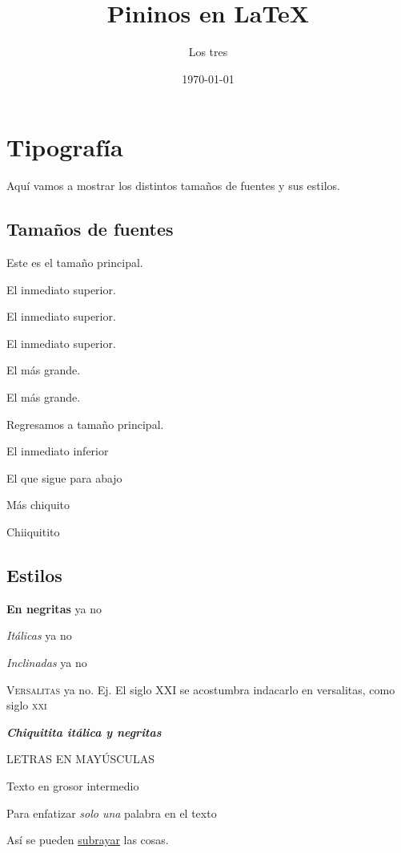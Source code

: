 \documentclass[10pt]{book}
\title{Pininos en \LaTeX}
\author{Los tres}
\date{\today}
\theoremstyle{definition}
\theoremstyle{theorem}
\theoremstyle{remark}
\begin{document}
\maketitle

\chapter{Tipografía}

Aquí vamos a mostrar los distintos tamaños de fuentes y sus estilos.
\section{Tamaños de fuentes}

\normalsize Este es el tamaño principal.

{\large El inmediato superior.}

{\Large El inmediato superior.}

{\LARGE El inmediato superior.}

{\huge El más grande.}

{\Huge El más grande.}

Regresamos a tamaño principal.

{\small El inmediato inferior}

{\footnotesize El que sigue para abajo}

{\scriptsize Más chiquito}

{\tiny Chiiquitito}

\section{Estilos}

{\bfseries En negritas} ya no

{\itshape Itálicas} ya no

{\slshape Inclinadas} ya no

{\scshape Versalitas} ya no. Ej. El siglo XXI se acostumbra indacarlo en versalitas, como siglo \textsc{xxi}


{\bfseries\itshape\tiny Chiquitita itálica y negritas }

{\uppercase {Letras en mayúsculas}} %

{\mdseries Texto en grosor intermedio} %

Para enfatizar \emph{solo una} palabra en el texto %

Así se pueden \ul{subrayar} las cosas. %
\end{document}
